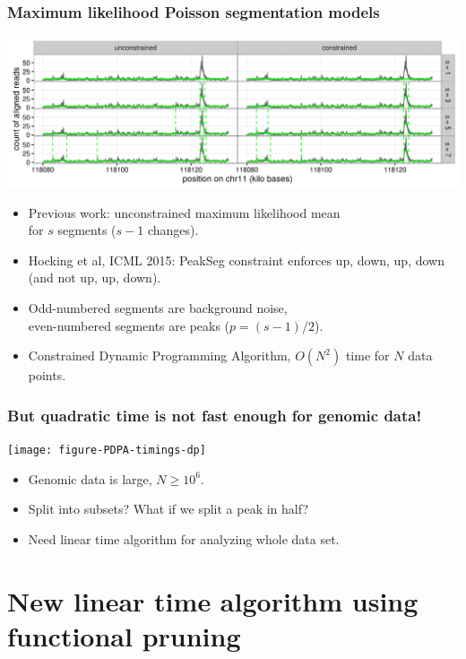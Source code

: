\documentclass{beamer}
\begin{document}
\begin{frame}
  \frametitle{Maximum likelihood Poisson segmentation models}
  \includegraphics[width=1\textwidth]{figure-Segmentor-PeakSeg}

  \begin{itemize}
  \item Previous work: unconstrained maximum likelihood mean\\
    for $s$ segments ($s-1$ changes).
  \item Hocking et al, ICML 2015: PeakSeg constraint enforces up, down, up,
    down (and not up, up, down). 
  \item Odd-numbered segments are background noise,\\
    even-numbered segments are peaks ($p = (s-1)/2$).
  \item Constrained Dynamic Programming Algorithm, $O(N^2)$ time for $N$ data points.
  \end{itemize}
\end{frame}

\begin{frame}
  \frametitle{But quadratic time is not fast enough for genomic data!}
  \texttt{[image: figure-PDPA-timings-dp]}
  \begin{itemize}
  \item Genomic data is large, $N \geq 10^6$.
  \item Split into subsets? What if we split a peak in half?
  \item Need linear time algorithm for analyzing whole data set.
  \end{itemize}
\end{frame}

\section{New linear time algorithm using functional pruning}
\end{document}
